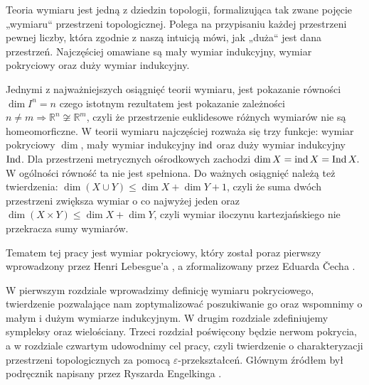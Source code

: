 Teoria wymiaru jest jedną z dziedzin topologii, formalizująca tak zwane pojęcie „wymiaru“ przestrzeni topologicznej. Polega na przypisaniu każdej przestrzeni pewnej liczby, która zgodnie z naszą intuicją mówi, jak „duża“ jest dana przestrzeń. Najczęściej omawiane są mały wymiar indukcyjny, wymiar pokryciowy oraz duży wymiar indukcyjny.

Jednymi z najważniejszych osiągnięć teorii wymiaru, jest pokazanie równości $\dim I^n=n$ \cite{bro1913} czego istotnym rezultatem jest pokazanie zależności $n\neq m \Longrightarrow \mathbb{R}^n\not \cong \mathbb{R}^m $, czyli że przestrzenie euklidesowe różnych wymiarów nie są homeomorficzne. W teorii wymiaru najczęściej rozważa się trzy funkcje: wymiar pokryciowy $\dim$, mały wymiar indukcyjny $\operatorname{ind}$ oraz duży wymiar indukcyjny $\operatorname{Ind}$. Dla przestrzeni metrycznych ośrodkowych zachodzi $ \dim X = \operatorname{ind} X = \operatorname{Ind} X.$ W ogólności równość ta nie jest spełniona.
Do ważnych osiągnięć należą też twierdzenia:
$\dim (X \cup Y) \le \dim X + \dim Y + 1$, czyli że suma dwóch przestrzeni zwiększa wymiar o co najwyżej jeden oraz $\dim (X \times Y) \le \dim X + \dim Y$, czyli wymiar iloczynu kartezjańskiego
nie przekracza sumy wymiarów.

Tematem tej pracy jest wymiar pokryciowy, który został poraz pierwszy wprowadzony przez Henri Lebesgue'a \cite{lebesque1921}, a zformalizowany przez Eduarda Čecha \cite{cech1993}. 

W pierwszym rozdziale wprowadzimy definicję wymiaru pokryciowego, twierdzenie pozwalające nam zoptymalizować poszukiwanie go oraz wspomnimy o małym i dużym wymiarze indukcyjnym. W drugim rozdziale zdefiniujemy sympleksy oraz wielościany. Trzeci rozdział poświęcony będzie nerwom pokrycia, a w rozdziale czwartym udowodnimy cel pracy, czyli twierdzenie o charakteryzacji przestrzeni topologicznych za pomocą $\varepsilon$-przekształceń. Głównym źródłem był podręcznik napisany przez Ryszarda Engelkinga \cite{engelking1995}.